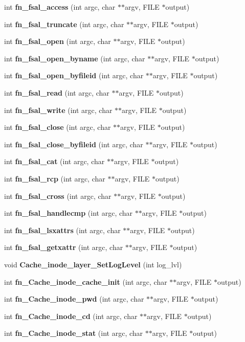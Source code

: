\begin{CompactItemize}
\item 
int {\bf fn\_\-fsal\_\-access} (int argc, char $\ast$$\ast$argv, FILE $\ast$output)
\item 
int {\bf fn\_\-fsal\_\-truncate} (int argc, char $\ast$$\ast$argv, FILE $\ast$output)
\item 
int {\bf fn\_\-fsal\_\-open} (int argc, char $\ast$$\ast$argv, FILE $\ast$output)
\item 
int {\bf fn\_\-fsal\_\-open\_\-byname} (int argc, char $\ast$$\ast$argv, FILE $\ast$output)
\item 
int {\bf fn\_\-fsal\_\-open\_\-byfileid} (int argc, char $\ast$$\ast$argv, FILE $\ast$output)
\item 
int {\bf fn\_\-fsal\_\-read} (int argc, char $\ast$$\ast$argv, FILE $\ast$output)
\item 
int {\bf fn\_\-fsal\_\-write} (int argc, char $\ast$$\ast$argv, FILE $\ast$output)
\item 
int {\bf fn\_\-fsal\_\-close} (int argc, char $\ast$$\ast$argv, FILE $\ast$output)
\item 
int {\bf fn\_\-fsal\_\-close\_\-byfileid} (int argc, char $\ast$$\ast$argv, FILE $\ast$output)
\item 
int {\bf fn\_\-fsal\_\-cat} (int argc, char $\ast$$\ast$argv, FILE $\ast$output)
\item 
int {\bf fn\_\-fsal\_\-rcp} (int argc, char $\ast$$\ast$argv, FILE $\ast$output)
\item 
int {\bf fn\_\-fsal\_\-cross} (int argc, char $\ast$$\ast$argv, FILE $\ast$output)
\item 
int {\bf fn\_\-fsal\_\-handlecmp} (int argc, char $\ast$$\ast$argv, FILE $\ast$output)
\item 
int {\bf fn\_\-fsal\_\-lsxattrs} (int argc, char $\ast$$\ast$argv, FILE $\ast$output)
\item 
int {\bf fn\_\-fsal\_\-getxattr} (int argc, char $\ast$$\ast$argv, FILE $\ast$output)
\item 
void {\bf Cache\_\-inode\_\-layer\_\-Set\-Log\-Level} (int log\_\-lvl)
\item 
int {\bf fn\_\-Cache\_\-inode\_\-cache\_\-init} (int argc, char $\ast$$\ast$argv, FILE $\ast$output)
\item 
int {\bf fn\_\-Cache\_\-inode\_\-pwd} (int argc, char $\ast$$\ast$argv, FILE $\ast$output)
\item 
int {\bf fn\_\-Cache\_\-inode\_\-cd} (int argc, char $\ast$$\ast$argv, FILE $\ast$output)
\item 
int {\bf fn\_\-Cache\_\-inode\_\-stat} (int argc, char $\ast$$\ast$argv, FILE $\ast$output)
$$
\end{CompactItemize}
